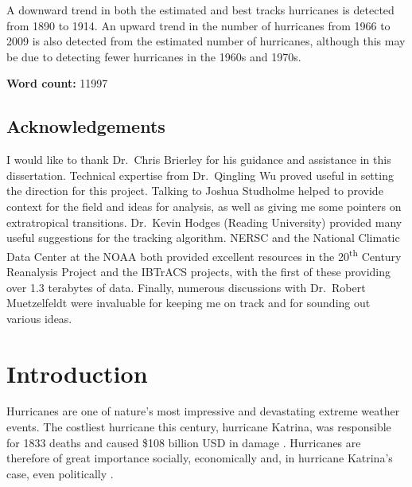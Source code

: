 \documentclass[pdftex,12pt,a4paper]{report}
\newcommand{\ts}{\textsuperscript}
\begin{document}
A downward trend in both the estimated and best tracks hurricanes is detected from 1890 to 1914. An
upward trend in the number of hurricanes from 1966 to 2009 is also detected from the estimated
number of hurricanes, although this may be due to detecting fewer hurricanes in the 1960s and 1970s.

\begin{center}
\textbf{Word count:} 11997 %
\end{center}

\newpage
\section*{Acknowledgements}

I would like to thank Dr.~Chris Brierley for his guidance and assistance in this dissertation.
Technical expertise from Dr.~Qingling Wu proved useful in setting the direction for this project.
Talking to Joshua Studholme helped to provide context for the field and ideas for analysis, as well
as giving me some pointers on extratropical transitions.
Dr.~Kevin Hodges (Reading University) provided many useful suggestions for the tracking algorithm.
NERSC and the National Climatic Data Center at the NOAA both provided excellent resources in the
20\ts{th} Century Reanalysis Project and the IBTrACS projects, with the first of these providing
over 1.3 terabytes of data.
Finally, numerous discussions with Dr.~Robert Muetzelfeldt were invaluable for keeping me on track
and for sounding out various ideas.

\newpage

\tableofcontents

\chapter{Introduction}


Hurricanes are one of nature's most impressive and devastating extreme weather events. The costliest
hurricane this century, hurricane Katrina, was responsible for 1833 deaths and caused \$108
billion USD in damage \parencite{knabb2006tropical}.
Hurricanes are therefore of great importance socially,
economically and, in hurricane Katrina's case, even politically \parencite{kellner2007katrina}.
\end{document}
